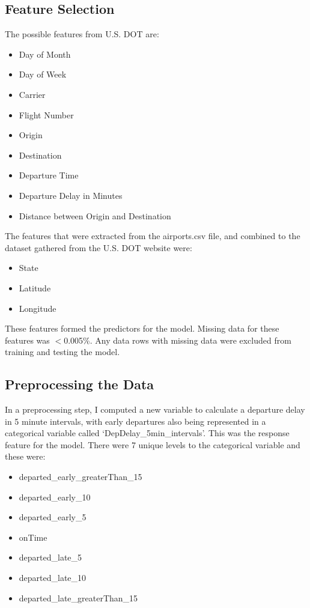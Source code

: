 \documentclass[a4paper, 10pt]{article}
\begin{document}
\subsection{Feature Selection}
The possible features from U.S. DOT are:
\begin{itemize}
\item{Day of Month}
\item{Day of Week}
\item{Carrier}
\item{Flight Number}
\item{Origin}
\item{Destination}
\item{Departure Time}
\item{Departure Delay in Minutes}
\item{Distance between Origin and Destination}
\end{itemize}

The features that were extracted from the airports.csv file, and combined to the dataset gathered from the U.S. DOT website were:
\begin{itemize}
\item{State}
\item{Latitude}
\item{Longitude}
\end{itemize}

\vspace{5mm}
These features formed the predictors for the model. Missing data for these features was $<$0.005\%. Any data rows with missing data were excluded from training and testing the model. 

\subsection{Preprocessing the Data}
In a preprocessing step, I computed a new variable to calculate a departure delay in 5 minute intervals, with early departures also being represented in a categorical variable called `DepDelay\_5min\_intervals'. This was the response feature for the model. There were 7 unique levels to the categorical variable and these were:
\begin{itemize}
\item{departed\_early\_greaterThan\_15}
\item{departed\_early\_10}
\item{departed\_early\_5}
\item{onTime}
\item{departed\_late\_5}
\item{departed\_late\_10}
\item{departed\_late\_greaterThan\_15}
\end{itemize}
\end{document}
